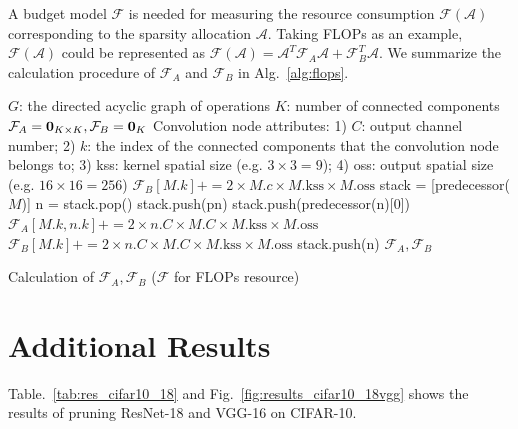 \documentclass[runningheads]{llncs}
\newcommand{\flops}{\mathcal{F}}
\newcommand{\alphas}{\mathcal{A}}
\begin{document}
  
  
  A budget model $\flops$ is needed for measuring the resource consumption $\flops(\alphas)$ corresponding to the sparsity allocation $\alphas$. Taking FLOPs as an example, $\flops(\alphas)$ could be represented as $\flops(\alphas) = \alphas^T \flops_A \alphas + \flops_B^T \alphas$. We summarize the calculation procedure of $\flops_A$ and $\flops_B$ in Alg.~\ref{alg:flops}.
  
  
  \begin{algorithm}[H]
  \begin{algorithmic}[1]
  \STATE $G$: the directed acyclic graph of operations
  \STATE $K$: number of connected components
  \STATE $\flops_A = {\bf 0}_{K \times K}, \flops_B={\bf 0}_{K}$
  \STATE Convolution node attributes: 1) $C$: output channel number; 2) $k$: the index of the connected components that the convolution node belongs to; 3) kss: kernel spatial size (e.g. $3\times 3 = 9$); 4) oss: output spatial size (e.g. $16\times 16=256$)
  \STATE $\flops_B[M.k] += 2 \times M.c \times M.\mbox{kss} \times M.\mbox{oss}$
  \ELSE
      \STATE stack = [predecessor($M$)]
      \STATE n = stack.pop()
      \STATE stack.push(pn)
      \ENDFOR
      \STATE stack.push(predecessor(n)[0])
      \STATE $\flops_A[M.k, n.k] += 2 \times n.C \times M.C \times M.\mbox{kss} \times M.\mbox{oss}$
      \STATE $\flops_B[M.k] += 2 \times n.C \times M.C \times M.\mbox{kss} \times M.\mbox{oss}$
      \ELSE
      \STATE stack.push(n)
      \ENDIF
      \ENDWHILE
  \ENDIF
  \ENDFOR
  \RETURN $\flops_A, \flops_B$
  \end{algorithmic}
  \caption{Calculation of $\flops_A, \flops_B$ ($\flops$ for FLOPs resource)}
  \label{alg:flops}
  \end{algorithm}
  
  
  \section{Additional Results}
  
  Table.~\ref{tab:res_cifar10_18} and Fig.~\ref{fig:results_cifar10_18vgg} shows the results of pruning ResNet-18 and VGG-16 on CIFAR-10.
\end{document}
